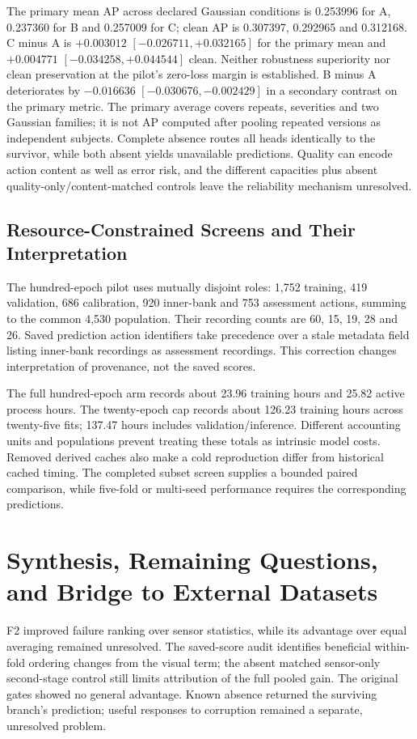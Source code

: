 The primary mean AP across declared Gaussian conditions is 0.253996 for A, 0.237360 for
B and 0.257009 for C; clean AP is 0.307397, 0.292965 and 0.312168. C minus A is
$+0.003012$ $[-0.026711,+0.032165]$ for the primary mean and $+0.004771$
$[-0.034258,+0.044544]$ clean. Neither robustness superiority nor clean preservation at
the pilot's zero-loss margin is established. B minus A deteriorates by $-0.016636$
$[-0.030676,-0.002429]$ in a secondary contrast on the primary metric. The primary
average covers repeats, severities and two Gaussian families; it is not AP computed
after pooling repeated versions as independent subjects. Complete absence routes all
heads identically to the survivor, while both absent yields unavailable predictions.
Quality can encode action content as well as error risk, and the different capacities
plus absent quality-only/content-matched controls leave the reliability mechanism
unresolved.

\subsection{Resource-Constrained Screens and Their Interpretation}
The hundred-epoch pilot uses mutually disjoint roles: 1,752 training, 419 validation,
686 calibration, 920 inner-bank and 753 assessment actions, summing to the common 4,530
population. Their recording counts are 60, 15, 19, 28 and 26. Saved prediction action
identifiers take precedence over a stale metadata field listing inner-bank recordings as
assessment recordings. This correction changes interpretation of provenance, not the
saved scores.

The full hundred-epoch arm records about 23.96 training hours and 25.82 active process
hours. The twenty-epoch cap records about 126.23 training hours across twenty-five fits;
137.47 hours includes validation/inference. Different accounting units and populations
prevent treating these totals as intrinsic model costs. Removed derived caches also make
a cold reproduction differ from historical cached timing. The completed subset screen
supplies a bounded paired comparison, while five-fold or multi-seed performance requires
the corresponding predictions.

\section{Synthesis, Remaining Questions, and Bridge to External Datasets}
F2 improved failure ranking over sensor statistics, while its advantage over equal
averaging remained unresolved. The saved-score audit identifies beneficial within-fold
ordering changes from the visual term; the absent matched sensor-only second-stage
control still limits attribution of the full pooled gain. The original gates showed no
general advantage. Known absence returned the surviving branch's prediction; useful
responses to corruption remained a separate, unresolved problem.

